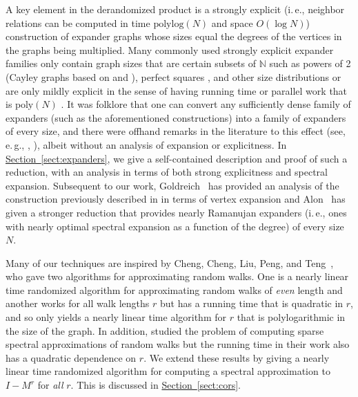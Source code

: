 \documentclass[11pt]{article}
\numberwithin{equation}{section}
\theoremstyle{definition}
\theoremstyle{plain}
\newcommand{\ie}{i.\,e.}
\newcommand{\eg}{e.\,g.}
\newcommand{\expref}[2]{\hyperref[#2]{#1~\ref{#2}}}
\newcommand{\poly}{\mathrm{poly}}
\newcommand{\polylog}{\mathrm{polylog}}
\numberwithin{myalgctr}{section}
\theoremstyle{named}
\begin{document}
A key element in the derandomized product is a strongly explicit (\ie, neighbor relations can be computed in time $\polylog (N)$ and space $O(\log N)$) construction of expander graphs whose sizes equal the degrees of the vertices in the graphs being multiplied. Many commonly used strongly explicit expander families only contain graph sizes that are certain subsets of $\mathbb{N}$ such as powers of 2 (Cayley graphs based on \cite{NaorNa93} and \cite{AlonGoHaPe92}), perfect squares \cite{Margulis73, GabberGa81}, and other size distributions \cite{ReingoldVaWi01} or are only mildly explicit in the sense of having running time or parallel work that is $\poly(N)$ \cite{LeePS15}.  It was folklore that one can convert any sufficiently dense family of expanders (such as the aforementioned constructions) into a family of expanders of every size, and there were offhand remarks in the literature to this effect  %
(see, \eg,
\cite{alon2008elementary}, \cite{goldreich08}), albeit without an analysis of expansion or explicitness. In \expref{Section}{sect:expanders}, we give a self-contained description and proof of such a reduction, with an analysis in terms of both strong explicitness and spectral expansion. Subsequent to our work, Goldreich~\cite{gnote} has provided an analysis of the construction previously described in \cite{goldreich08} in terms of vertex expansion and Alon~\cite{alon_inprep} has given a stronger reduction that provides nearly Ramanujan expanders (\ie, ones with nearly optimal spectral expansion as a function of the degree) of every size $N$. 

Many of our techniques are inspired by Cheng, Cheng, Liu, Peng, and Teng~\cite{cheng2015}, who gave two algorithms for approximating random walks. One is a nearly linear time randomized algorithm for approximating random walks of \emph{even} length and another works for all walk lengths $r$ but has a running time that is quadratic in $r$, and so only yields a nearly linear time algorithm for $r$ that is polylogarithmic in the size of the graph. In addition, \cite{JKPS17} studied the problem of computing sparse spectral approximations of random walks but the running time in their work also has a quadratic dependence on $r$. We extend these results by giving a nearly linear time randomized algorithm for computing a spectral approximation to $I-M^r$ for \emph{all} $r$. This is discussed in \expref{Section}{sect:cors}. 

%
\iffalse
\end{document}
